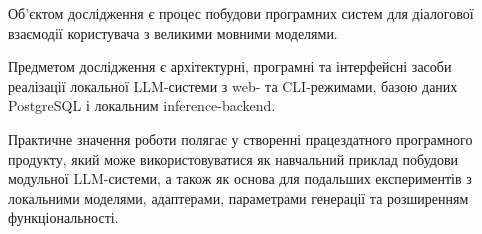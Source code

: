 Об'єктом дослідження є процес побудови програмних систем для діалогової взаємодії користувача з великими мовними моделями.

Предметом дослідження є архітектурні, програмні та інтерфейсні засоби реалізації локальної LLM-системи з web- та CLI-режимами, базою даних PostgreSQL і локальним inference-backend.

Практичне значення роботи полягає у створенні працездатного програмного продукту, який може використовуватися як навчальний приклад побудови модульної LLM-системи, а також як основа для подальших експериментів з локальними моделями, адаптерами, параметрами генерації та розширенням функціональності.

\newpage

